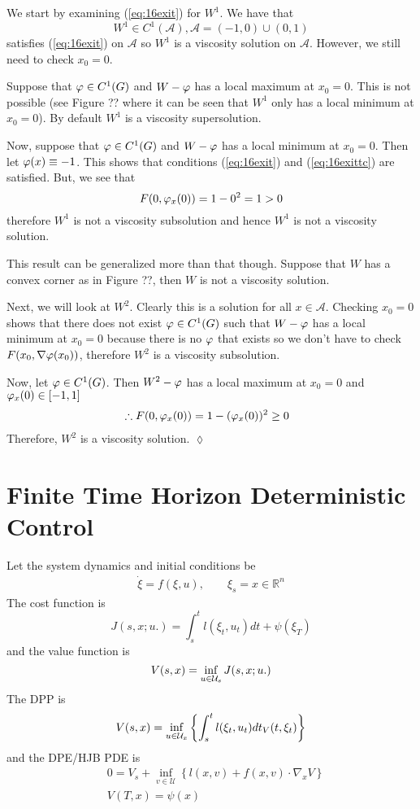 \begin{example}
We start by examining (\ref{eq:16exit}) for $W^1$. We have that
$$W^1\in C^1(\mathcal{A}), \mathcal{A}=(-1,0)\cup(0,1)$$
satisfies (\ref{eq:16exit}) on $\mathcal{A}$ so $W^1$ is a viscosity solution on $\mathcal{A}$. However, we still need to check $x_0=0$.

Suppose that $\varphi\in C^1(G)$ and $W-\varphi$ has a local maximum at $x_0=0$. This is not possible (see Figure ?? where it can be seen that $W^1$ only has a local minimum at $x_0=0$). By default $W^1$ is a viscosity supersolution.

Now, suppose that $\varphi\in C^1(G)$ and $W-\varphi$ has a local minimum at $x_0=0$. Then let $\varphi(x)\equiv-1$. This shows that conditions (\ref{eq:16exit}) and (\ref{eq:16exittc}) are satisfied. But, we see that
$$F(0,\varphi_x(0))=1-0^2=1>0$$
therefore $W^1$ is not a viscosity subsolution and hence $W^1$ is not a viscosity solution.

This result can be generalized more than that though. Suppose that $W$ has a convex corner as in Figure ??, then $W$ is not a viscosity solution.

Next, we will look at $W^2$. Clearly this is a solution for all $x\in\mathcal{A}$. Checking $x_0=0$ shows that there does not exist $\varphi\in C^1(G)$ such that $W-\varphi$ has a local minimum at $x_0=0$ because there is no $\varphi$ that exists so we don't have to check $F(x_0,\nabla\varphi(x_0))$, therefore $W^2$ is a viscosity subsolution.

Now, let $\varphi\in C^1(G)$. Then $W^2-\varphi$ has a local maximum at $x_0=0$ and $\varphi_x(0)\in[-1,1]$
\begin{align*}
&\therefore F(0,\varphi_x(0)) = 1-(\varphi_x(0))^2\geq0
\end{align*}
Therefore, $W^2$ is a viscosity solution.
$\lozenge$
\end{example}

\section{Finite Time Horizon Deterministic Control}
Let the system dynamics and initial conditions be
\begin{align*}
\dot{\xi} = f(\xi,u), \qquad \xi_s=x\in\mathbb{R}^n
\end{align*}
The cost function is
$$J(s,x;u.) = \int_s^tl(\xi_t,u_t)dt+\psi(\xi_T)$$
and the value function is
$$V(s,x) = \inf_{u\in\mathcal{U}_s}J(s,x;u.)$$
The DPP is
$$V(s,x) = \inf_{u\in\mathcal{U}_x}\left\lbrace \int_s^tl(\xi_t,u_t)dt_V(t,\xi_t) \right\rbrace$$
and the DPE/HJB PDE is
\begin{align}
\label{eq:16dpe}
&0 = V_s + \inf_{v\in\mathcal{U}}\left\lbrace l(x,v)+f(x,v)\cdot\nabla_xV\right\rbrace \\
&V(T,x) = \psi(x) \nonumber
\end{align}

